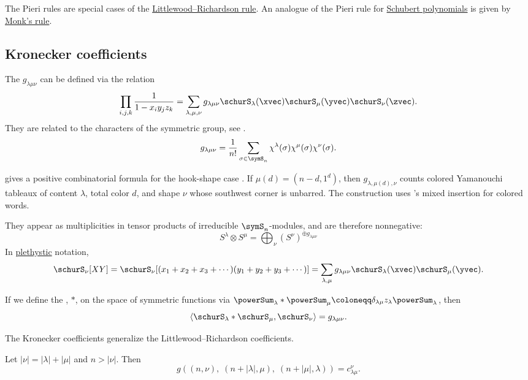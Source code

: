 The Pieri rules are special cases of the
\hyperref[schurLittlewoodRichardson]{Littlewood--Richardson rule}.
An analogue of the Pieri rule for \hyperref[schubert]{Schubert polynomials}
is given by \hyperref[schubertMonksRule]{Monk's rule}.


\subsection[schurKroneckerCoefficients]{Kronecker coefficients}

The \label{kroneckerCoefficient}
$g_{\lambda\mu\nu}$ can be defined via the relation
\[
\prod_{i,j,k} \frac{1}{1-x_i y_j z_k} =
\sum_{\lambda,\mu,\nu} g_{\lambda\mu\nu} \schurS_\lambda(\xvec)\schurS_\mu(\yvec) \schurS_\nu(\zvec).
\]
They are related to the characters of the symmetric group,
see \cite[pp.~68--69]{Schur1901}.
\[
g_{\lambda\mu\nu} =\frac{1}{n!}
\sum_{\sigma \in \symS_n} \chi^{\lambda}(\sigma)\chi^{\mu}(\sigma)\chi^{\nu}(\sigma).
\]

 gives a positive combinatorial formula for the hook-shape
case \cite{Blasiak2012x}.  If $\mu(d)=(n-d,1^d)$, then
$g_{\lambda,\mu(d),\nu}$ counts colored Yamanouchi tableaux of content
$\lambda$, total color $d$, and shape $\nu$ whose southwest corner is
unbarred.  The construction uses 's mixed insertion for
colored words.


They appear as multiplicities in tensor products of irreducible
$\symS_n$-modules, and are therefore nonnegative:
\[
S^\lambda \otimes S^\mu = \bigoplus_\nu \left( S^\nu \right)^{ \oplus g_{\lambda\mu\nu}}
\]
In \hyperref[plethysm]{plethystic} notation,
\[
\schurS_\nu[XY] = \schurS_\nu[(x_1+x_2+x_3+\dotsb)(y_1+y_2+y_3+\dotsb)]
= \sum_{\lambda,\mu} g_{\lambda\mu\nu} \schurS_\lambda(\xvec) \schurS_\mu(\yvec).
\]

If we define the 
\label{innerTensorProduct}, $\ast$, on the space
of symmetric functions via $\powerSum_\lambda \ast \powerSum_\mu \coloneqq \delta_{\lambda \mu} z_\lambda \powerSum_\lambda$,
then
\[
  \langle \schurS_\lambda \ast \schurS_\mu, \schurS_\nu \rangle = g_{\lambda\mu\nu}.
\]


The Kronecker coefficients generalize the Littlewood--Richardson coefficients.
\begin{theorem}[Murnaghan]
Let $|\nu| = |\lambda|+|\mu|$ and $n>|\nu|$. Then
\[
g( (n,\nu),\; (n+|\lambda|,\mu),\; (n+|\mu|,\lambda) ) = c^{\nu}_{\lambda \mu}.
\]
\end{theorem}

